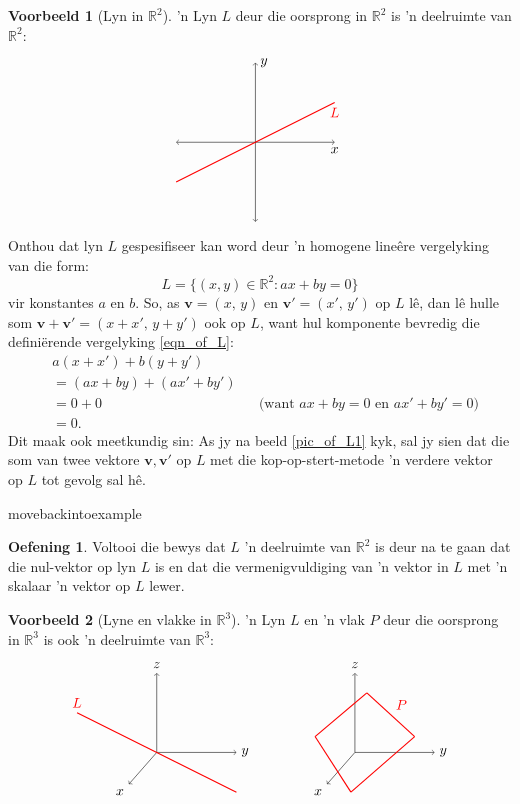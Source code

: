 \documentclass[a4paper,11pt]{book}
\theoremstyle{definition}
\newtheorem{exercise}{Oefening}
\newtheorem{example_environment}{Voorbeeld}[chapter]
\newcommand{\be}{\begin{equation}}
\newcommand{\ee}{\end{equation}}
\newcommand{\ba}{\begin{aligned}}
\newcommand{\ea}{\end{aligned}}
\newcommand{\ve}[1]{\mathbf{#1}}
\newenvironment{example}
	{
		\begin{oframed}
		\begin{example_environment}
	}
	{
		\end{example_environment}
		\end{oframed}
	}
\begin{document}
\begin{example}[Lyn in $\mathbb{R}^2$] 'n Lyn $L$ deur die oorsprong in
	$\mathbb{R}^2$ is 'n deelruimte van $\mathbb{R}^2$:
	\be \label{pic_of_L1}
	\ba
	\begin{tikzpicture}
		\draw[<->] (-2, 0) -- (2,0) node[below] {$x$};
		\draw[<->] (0, -2) -- (0, 2) node[right] {$y$};
		\draw[thick, red] (-2, -1) -- (2, 1) node[below] {$L$};
	\end{tikzpicture}
	\ea
	\ee
	Onthou dat lyn $L$ gespesifiseer kan word deur 'n homogene line{\^e}re
	vergelyking van die form:
	\be \label{eqn_of_L}
	L = \{ (x,y) \in \mathbb{R}^2 : ax + by = 0 \}
	\ee
	vir konstantes $a$ en $b$. So, as $\ve{v} = (x, \, y)$ en $\ve{v}' =
	(x', \, y')$ op $L$ l{\^e}, dan l{\^e} hulle som $\ve{v} + \ve{v}' = (x
	+ x', \, y + y')$ ook op $L$, want hul komponente bevredig die
	defini{\"e}rende vergelyking \eqref{eqn_of_L}:
	\begin{align*}
		&a(x + x') + b (y + y')\\
		& = (ax + by) + (ax' + by') \\
		&= 0 + 0 && \mbox{(want $ax + by = 0$ en $ax' + by' = 0$)} \\
		&= 0.
	\end{align*}
	Dit maak ook meetkundig sin: As jy na beeld \eqref{pic_of_L1} kyk, sal
	jy sien dat die som van twee vektore $\ve{v}, \ve{v}'$ op $L$ met die
	kop-op-stert-metode 'n verdere vektor op $L$ tot gevolg sal h{\^e}.

\end{example}movebackintoexample
	\begin{exercise} Voltooi die bewys dat $L$ 'n deelruimte van
	$\mathbb{R}^2$ is deur na te gaan dat die nul-vektor op lyn $L$ is
	en dat die vermenigvuldiging van 'n vektor in $L$ met 'n skalaar 'n
	vektor op $L$ lewer.
\end{exercise}
\begin{example}[Lyne en vlakke in $\mathbb{R}^3$] 'n Lyn $L$ en 'n vlak $P$
	deur die oorsprong in $\mathbb{R}^3$ is ook 'n deelruimte van
	$\mathbb{R}^3$:
	\be \label{pic_of_L}
	\ba
	\begin{tikzpicture}
		\draw[->] (0, 0) -- (2,0) node[right] {$y$};
		\draw[->] (0, 0) -- (0, 2) node[above] {$z$};
		\draw[->] (0,0) -- (-0.7, -0.8) node[below left] {$x$};
		\draw[thick, red] (-2, 1) node[above] {$L$} -- (2, -1);
	\end{tikzpicture}
	\ea
	\qquad \qquad
	\ba
	\begin{tikzpicture}
		\draw[->] (0, 0) -- (2,0) node[right] {$y$};
		\draw[->] (0, 0) -- (0, 2) node[above] {$z$};
		\draw[->] (0,0) -- (-0.7, -0.8) node[below left] {$x$};
		\draw[thick, red] (-0.1, -1) -- (-1, 0.4);
		\draw[thick, red] (-1, 0.4) -- (0.3, 1.5);
		\draw[thick, red] (0.3, 1.5) -- node[above right] {$P$} (1.5, 0.4);
		\draw[thick, red] (1.5, 0.4) -- (-0.1, -1);
	\end{tikzpicture}
	\ea
	\ee

\end{example}
\end{document}
